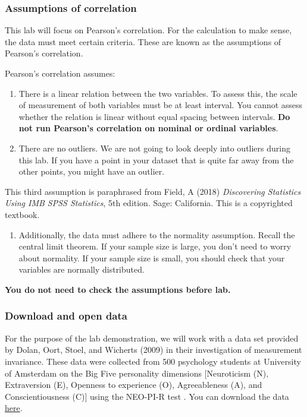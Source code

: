 \documentclass[
]{book}
\providecommand{\tightlist}{%
  \setlength{\itemsep}{0pt}\setlength{\parskip}{0pt}}
\begin{document}
\hypertarget{assumptions-of-correlation-1}{%
\subsubsection{Assumptions of correlation}\label{assumptions-of-correlation-1}}

This lab will focus on Pearson's correlation. For the calculation to make sense, the data must meet certain criteria. These are known as the assumptions of Pearson's correlation.

Pearson's correlation assumes:

\begin{enumerate}
\def\labelenumi{\arabic{enumi}.}
\item
  There is a linear relation between the two variables. To assess this, the scale of measurement of both variables must be at least interval. You cannot assess whether the relation is linear without equal spacing between intervals. \textbf{Do not run Pearson's correlation on nominal or ordinal variables}.
\item
  There are no outliers. We are not going to look deeply into outliers during this lab. If you have a point in your dataset that is quite far away from the other points, you might have an outlier.
\end{enumerate}

This third assumption is paraphrased from Field, A (2018) \emph{Discovering Statistics Using IMB SPSS Statistics}, 5th edition. Sage: California. This is a copyrighted textbook.

\begin{enumerate}
\def\labelenumi{\arabic{enumi}.}
\setcounter{enumi}{2}
\tightlist
\item
  Additionally, the data must adhere to the normality assumption. Recall the central limit theorem. If your sample size is large, you don't need to worry about normality. If your sample size is small, you should check that your variables are normally distributed.
\end{enumerate}

\textbf{You do not need to check the assumptions before lab.}

\hypertarget{download-and-open-data-1}{%
\subsubsection{Download and open data}\label{download-and-open-data-1}}

For the purpose of the lab demonstration, we will work with a data set provided by Dolan, Oort, Stoel, and Wicherts (2009) in their investigation of measurement invariance. These data were collected from 500 psychology students at University of Amsterdam on the Big Five personality dimensions {[}Neuroticism (N), Extraversion (E), Openness to experience (O), Agreeableness (A), and Conscientiousness (C){]} using the NEO-PI-R test . You can download the data \href{https://moodle.stfx.ca/mod/resource/view.php?id=930539}{here}.
\end{document}
